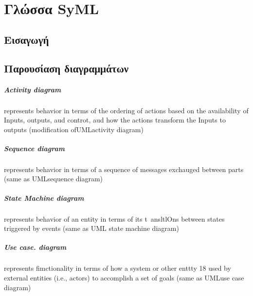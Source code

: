 \documentclass[a4paper,12pt,twoside]{report}
\begin{document}
{%
	\chapter{Γλώσσα SyML}
		\label{κεφ.:Γλώσσα SyML}

		\section{Εισαγωγή}
		
		\section{Παρουσίαση διαγραμμάτων \cite{APracticalGuideToSysML}}
			
			\paragraph{Activity diagram} {represents behavior in terms of the ordering of actions based on the availability of Inputs, outputs, aud controt, aud how the actions transform the Inputs to outputs (modification ofUMLactivity diagram)
			}
			\paragraph{Sequence diagram} {represents behavior in terms of a sequence of messages exchauged between parts (same as UMLsequence diagram)
			}
			\paragraph{State Machine diagram} {represents behavior of an entity in terms of its t~ansltlOns between states triggered by events (same as UML state machine diagram)
			}
			\paragraph{Use case. diagram} {represents fimctionality in terms of how a system or other enttty 18 used by external entities (i.e., actors) to accomplish a set of goals (same as UMLuse case diagram)
			}
}
\end{document}
